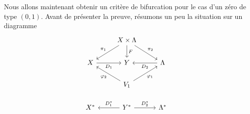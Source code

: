 \documentclass[memoire.tex]{subfiles}
\begin{document}
Nous allons maintenant obtenir un critère de bifurcation pour le cas d'un zéro de type $(0,1)$.
Avant de présenter la preuve, résumons un peu la situation sur un diagramme
\[\begin{tikzcd}
	& {X\times\Lambda} & \\
	X & Y & \Lambda \\
	& {V_1} \\
	{X^{*}} & {Y^{*}} & {\Lambda^{*}}
	\arrow["{{\pi_1}}"', from=1-2, to=2-1]
	\arrow["F", from=1-2, to=2-2]
	\arrow["{{\pi_2}}", from=1-2, to=2-3]
	\arrow["{{D_1}}"', from=2-1, to=2-2]
	\arrow["{{D_2}}", from=2-3, to=2-2]
	\arrow["{\varphi_2}", from=3-2, to=2-1]
	\arrow["{\varphi_1}"', from=3-2, to=2-3]
	\arrow["{{D_1^{*}}}"', from=4-2, to=4-1]
	\arrow["{{D_2^{*}}}", from=4-2, to=4-3]
\end{tikzcd}\]
\end{document}
